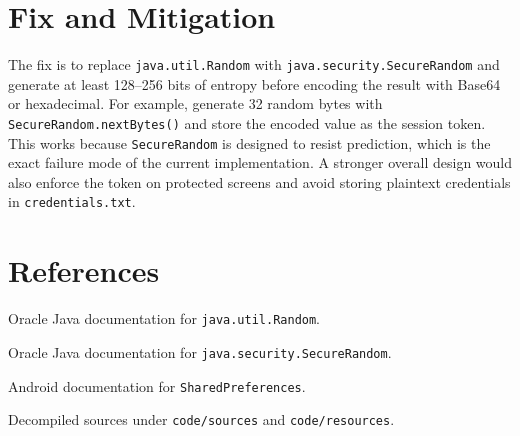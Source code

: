 ﻿\documentclass[10pt,twocolumn,letterpaper]{article}
\begin{document}
\section*{Fix and Mitigation}
The fix is to replace \texttt{java.util.Random} with \texttt{java.security.SecureRandom} and generate at least 128--256 bits of entropy before encoding the result with Base64 or hexadecimal. For example, generate 32 random bytes with \texttt{SecureRandom.nextBytes()} and store the encoded value as the session token. This works because \texttt{SecureRandom} is designed to resist prediction, which is the exact failure mode of the current implementation. A stronger overall design would also enforce the token on protected screens and avoid storing plaintext credentials in \texttt{credentials.txt}.

\section*{References}
\begin{enumerate}[label={[}\arabic*{]}]
\item Oracle Java documentation for \texttt{java.util.Random}.
\item Oracle Java documentation for \texttt{java.security.SecureRandom}.
\item Android documentation for \texttt{SharedPreferences}.
\item Decompiled sources under \texttt{code/sources} and \texttt{code/resources}.
\end{enumerate}
\end{document}
